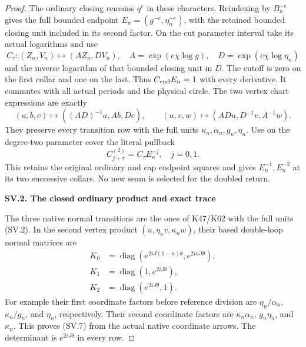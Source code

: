 \begin{proof}
The ordinary closing remains \(q^e\) in these characters.
Reindexing by \(B_n^{-e}\) gives the full bounded
endpoint \(E_n=(g^{-e},\eta_n^{-e})\), with the retained
bounded closing unit included in its second factor.
On the cut parameter interval take its actual
logarithms and use
\[
 C_\tau:(Z_n,V_n)\mapsto(AZ_n,DV_n),\quad
 A=\exp(e\chi\log g),\quad
 D=\exp(e\chi\log\eta_n)                              \tag{SV.4}
\]
and the inverse logarithm of that bounded closing
unit in \(D\). The cutoff is zero on the first collar
and one on the last. Thus \(C_{\rm end}E_n=1\)
with every derivative. It commutes with all actual
periods and the physical circle. The two vertex
chart expressions are exactly
\[
 (a,b,c)\mapsto((AD)^{-1}a,Ab,Dc),\qquad
 (u,v,w)\mapsto(ADu,D^{-1}v,A^{-1}w).
                                                        \tag{SV.5}
\]
They preserve every transition row with the full units
\(\kappa_n,\alpha_n,g_n,\eta_n\).
Use on the degree-two parameter cover the literal
pullback
\[
          C^{(2)}_{j+\tau}=C_\tau E_n^{-j},\quad j=0,1.
                                                        \tag{SV.6}
\]
This retains the original ordinary and cap endpoint
squares and gives \(E_n^{-1},E_n^{-2}\) at its two
successive collars. No new seam is selected for the
doubled return.

\par

\medskip\noindent\textbf{SV.2. The closed ordinary product and exact trace}

\par\nobreak

The three native normal transitions are the ones of
K47/K62 with the full units (SV.2). In the second
vertex product \((u,\eta_n v,\kappa_n w)\), their
based double-loop normal matrices are
\[
 \begin{split}
 K_0&=\operatorname{diag}
       (e^{2iJ(1-n)\theta},e^{2inJ\theta}),\\
 K_1&=\operatorname{diag}(1,e^{2iJ\theta}),\\
 K_2&=\operatorname{diag}(e^{2iJ\theta},1).
 \end{split}                                          \tag{SV.7}
\]
For example their first coordinate factors before
reference division are \(\eta_n/\alpha_n\),
\(\kappa_n/g_n\), and \(\eta_n\), respectively.
Their second coordinate factors are
\(\kappa_n\alpha_n\), \(g_n\eta_n\), and
\(\kappa_n\). This proves (SV.7) from the actual
native coordinate arrows. The determinant is
\(e^{2iJ\theta}\) in every row.


\end{proof}

